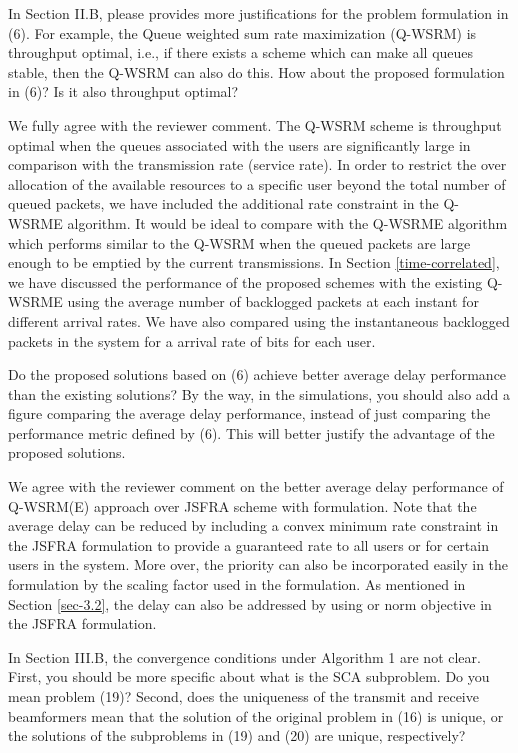 \begin{itemize}

 In Section II.B, please provides more justifications for the problem formulation in (6). For example, the Queue weighted sum rate maximization (Q-WSRM) is throughput optimal, i.e., if there exists a scheme which can make all queues stable, then the Q-WSRM can also do this. How about the proposed formulation in (6)? Is it also throughput optimal? 

\resp We fully agree with the reviewer comment. The Q-WSRM scheme is throughput optimal when the queues associated with the users are significantly large in comparison with the transmission rate (service rate). In order to restrict the over allocation of the available resources to a specific user beyond the total number of queued packets, we have included the additional rate constraint in the Q-WSRME algorithm. It would be ideal to compare with the Q-WSRME algorithm which performs similar to the Q-WSRM when the queued packets are large enough to be emptied by the current transmissions. In Section \ref{time-correlated}, we have discussed the performance of the proposed schemes with the existing \ac{Q-WSRME} using the average number of backlogged packets at each instant for different arrival rates. We have also compared using the instantaneous backlogged packets in the system for a arrival rate of  bits for each user.

 Do the proposed solutions based on (6) achieve better average delay performance than the existing solutions? By the way, in the simulations, you should also add a figure comparing the average delay performance, instead of just comparing the performance metric defined by (6). This will better justify the advantage of the proposed solutions.

\resp We agree with the reviewer comment on the better average delay performance of Q-WSRM(E) approach over JSFRA scheme with  formulation. Note that the average delay can be reduced by including a convex minimum rate constraint in the JSFRA formulation to provide a guaranteed rate to all users or for certain users in the system. More over, the priority can also be incorporated easily in the formulation by the scaling factor  used in the formulation. As mentioned in Section \ref{sec-3.2}, the delay can also be addressed by using  or  norm objective in the JSFRA formulation.

 In Section III.B, the convergence conditions under Algorithm 1 are not clear. First, you should be more specific about what is the SCA subproblem. Do you mean problem (19)? Second, does the uniqueness of the transmit and receive beamformers mean that the solution of the original problem in (16) is unique, or the solutions of the subproblems in (19) and (20) are unique, respectively?


\end{itemize}

